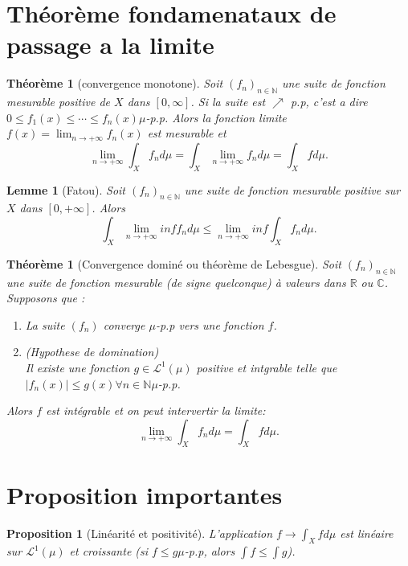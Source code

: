 \documentclass[a4paper,12pt,french]{report}
\theoremstyle{break}
\newtheorem{theo}[defin]{Théorème}
\newtheorem{prop}[defin]{Proposition}
\newtheorem{lemme}[defin]{Lemme}
\begin{document}
\section{Théorème fondamenataux de passage a la limite}
\begin{theo}[convergence monotone]
       Soit $(f_{n})_{n \in \mathbb{N}}$ une suite de fonction mesurable positive de $X$ dans $[0, \infty]$. Si la suite est $\nearrow$ p.p, c'est a dire $0 \leq f_{1}(x) \leq \cdots \leq f_{n}(x) \mu$-p.p. Alors la fonction limite $f(x) = \lim_{n \rightarrow +\infty} f_{n}(x)$ est mesurable et $$\lim_{n \rightarrow +\infty} \int_{X} f_{n} d\mu = \int_{X}\lim_{n \rightarrow +\infty} f_{n} d\mu = \int_{X} f d\mu.$$ 
\end{theo}

\begin{lemme}[Fatou] 
       Soit $(f_{n})_{n \in \mathbb{N}}$ une suite de fonction mesurable positive sur $X$ dans $[0, +\infty]$. Alors $$\int_{X} \lim_{n \rightarrow +\infty} inf f_{n} d\mu \leq \lim_{n \rightarrow +\infty} inf \int_{X} f_{n} d\mu.$$
\end{lemme}

\begin{theo}[Convergence dominé ou théorème de Lebesgue]
       Soit $(f_{n})_{n \in \mathbb{N}}$ une suite de fonction mesurable (de signe quelconque) à valeurs dans $\mathbb{R}$ ou $\mathbb{C}$.\\ Supposons que :
       \begin{enumerate}
              \item La suite $(f_{n})$ converge $\mu$-p.p vers une fonction $f$.
              \item (Hypothese de domination)\\ Il existe une fonction $g \in \mathcal{L}^{1}(\mu)$ positive et intgrable telle que $|f_{n}(x)| \leq g(x) \forall n \in \mathbb{N} \mu$-p.p.
       \end{enumerate}
       Alors $f$ est intégrable et on peut intervertir la limite: $$\lim_{n  \rightarrow +\infty} \int_{X} f_{n} d\mu = \int_{X} f d\mu.$$
\end{theo}

\section{Proposition importantes}
\begin{prop}[Linéarité et positivité]
       L'application $f \rightarrow \int_{X} f d\mu$ est linéaire sur $\mathcal{L}^{1}(\mu)$ et croissante (si $f \leq g \mu$-p.p, alors $\int f \leq \int g$).
\end{prop}
\end{document}
